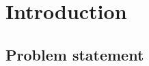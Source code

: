 \chapter{Introduction}
\label{chapter:intro}






\section{Problem statement}
\label{sec:problemstat}

